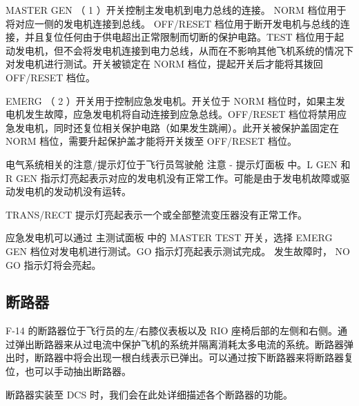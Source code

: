 MASTER GEN （ 1 ）开关控制主发电机到电力总线的连接。 NORM 档位用于将对应一侧的发电机连接到总线。 OFF/RESET 档位用于断开发电机与总线的连接，并且复位任何由于供电超出正常限制而切断的保护电路。TEST 档位用于起动发电机，但不会将发电机连接到电力总线，从而在不影响其他飞机系统的情况下对发电机进行测试。开关被锁定在 NORM 档位，提起开关后才能将其拨回 OFF/RESET 档位。

EMERG （ 2 ）开关用于控制应急发电机。开关位于 NORM 档位时，如果主发电机发生故障，应急发电机将自动连接到应急总线。OFF/RESET 档位将禁用应急发电机，同时还复位相关保护电路（如果发生跳闸）。此开关被保护盖固定在 NORM 档位，需要升起保护盖才能将开关拨至 OFF/RESET 档位。

电气系统相关的注意/提示灯位于飞行员驾驶舱 注意 - 提示灯面板 中。L GEN 和 R GEN 指示灯亮起表示对应的发电机没有正常工作。可能是由于发电机故障或驱动发电机的发动机没有运转。

TRANS/RECT 提示灯亮起表示一个或全部整流变压器没有正常工作。

应急发电机可以通过 主测试面板 中的 MASTER TEST 开关，选择 EMERG GEN 档位对发电机进行测试。GO 指示灯亮起表示测试完成。 发生故障时， NO GO 指示灯将会亮起。

\subsection{断路器}
F-14 的断路器位于飞行员的左/右膝仪表板以及 RIO 座椅后部的左侧和右侧。通过弹出断路器来从过电流中保护飞机的系统并隔离消耗太多电流的系统。断路器弹出时，断路器中将会出现一根白线表示已弹出。可以通过按下断路器来将断路器复位，也可以手动抽出断路器。

断路器实装至 DCS 时，我们会在此处详细描述各个断路器的功能。





